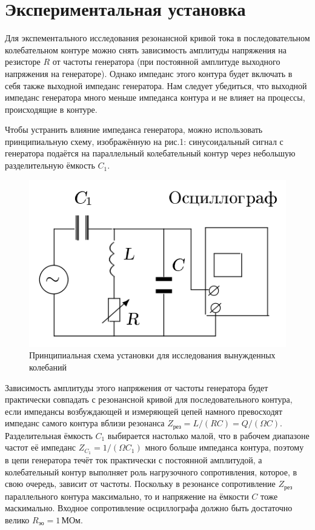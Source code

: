 \documentclass[12pt]{article}
\begin{document}
\section*{Экспериментальная установка}
\par	
	Для экспементального исследования резонансной кривой тока в последовательном колебательном контуре можно снять зависимость амплитуды напряжения на резисторе $R$ от частоты генератора (при постоянной амплитуде выходного напряжения на генераторе). Однако импеданс этого контура будет включать в себя также выходной импеданс генератора. Нам следует убедиться, что выходной импеданс генератора много меньше импеданса контура и не влияет на процессы, происходящие в контуре.
\par	
	Чтобы устранить влияние импеданса генератора, можно использовать принципиальную схему, изображённую на рис.1: синусоидальный сигнал с генератора подаётся на параллельный колебательный контур через небольшую разделительную ёмкость $C_1$.
\begin{figure}[h!]
	\centering
	\includegraphics[width = 7 cm, height = 4 cm]{image1.png}
	\caption{Принципиальная схема установки для исследования вынужденных колебаний}
\end{figure}
\newpage
\par	
	Зависимость амплитуды этого напряжения от частоты генератора будет практически совпадать с резонансной кривой для последовательного контура, если импедансы возбуждающей и измеряющей цепей намного превосходят импеданс самого контура вблизи резонанса $Z_\text{рез} = L / \left( R C \right) = Q / \left(\Omega C \right)$. Разделительная ёмкость $C_1$ выбирается настолько малой, что в рабочем диапазоне частот её импеданс $Z_\text{$C_1$} = 1 / \left( \Omega C_1 \right)$ много больше импеданса контура, поэтому в цепи генератора течёт ток практически с постоянной амплитудой, а колебательный контур выполняет роль нагрузочного сопротивления, которое, в свою очередь, зависит от частоты. Поскольку в резонансе сопротивление $Z_\text{рез}$ параллельного контура максимально, то и напряжение на ёмкости $C$ тоже маскимально. Входное сопротивление осциллографа должно быть достаточно велико $R_\text{эо} = 1 \, \text{МОм}$.
\end{document}

